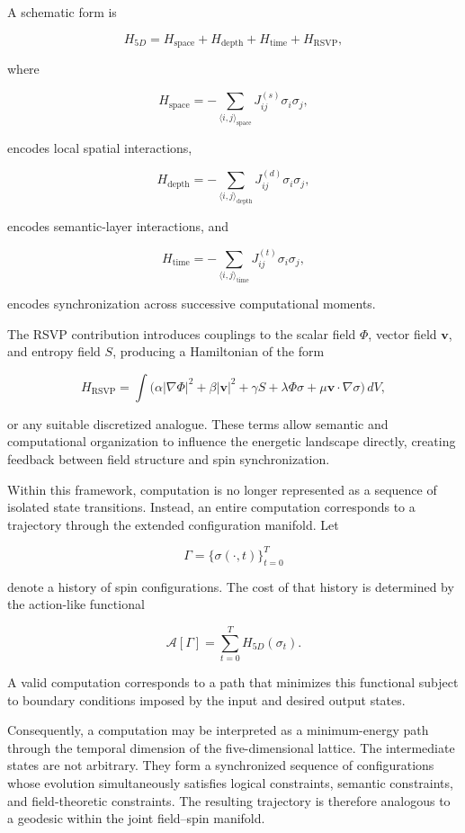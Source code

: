 \documentclass[12pt,letterpaper]{article}
\theoremstyle{remark}
\begin{document}
A schematic form is

\[
H_{5D} =
H_{\mathrm{space}}
+
H_{\mathrm{depth}}
+
H_{\mathrm{time}}
+
H_{\mathrm{RSVP}},
\]

where

\[
H_{\mathrm{space}} = -\sum_{\langle i,j\rangle_{\mathrm{space}}}
J^{(s)}_{ij}
\sigma_i\sigma_j,
\]

encodes local spatial interactions,

\[
H_{\mathrm{depth}} = -\sum_{\langle i,j\rangle_{\mathrm{depth}}}
J^{(d)}_{ij}
\sigma_i\sigma_j,
\]

encodes semantic-layer interactions, and

\[
H_{\mathrm{time}} = -
\sum_{\langle i,j\rangle_{\mathrm{time}}}
J^{(t)}_{ij}
\sigma_i\sigma_j,
\]

encodes synchronization across successive computational moments.

The RSVP contribution introduces couplings to the scalar field $\Phi$, vector field $\mathbf{v}$, and entropy field $S$, producing a Hamiltonian of the form

\[
H_{\mathrm{RSVP}} =
\int
\Big(
\alpha|\nabla\Phi|^2
+
\beta|\mathbf{v}|^2
+
\gamma S
+
\lambda\Phi\sigma
+
\mu\mathbf{v}\cdot\nabla\sigma
\Big)\,dV,
\]

or any suitable discretized analogue. These terms allow semantic and computational organization to influence the energetic landscape directly, creating feedback between field structure and spin synchronization.

Within this framework, computation is no longer represented as a sequence of isolated state transitions. Instead, an entire computation corresponds to a trajectory through the extended configuration manifold. Let

\[
\Gamma =
\bigl\{
\sigma(\cdot,t)
\bigr\}_{t=0}^{T}
\]

denote a history of spin configurations. The cost of that history is determined by the action-like functional

\[
\mathcal{A}[\Gamma] =
\sum_{t=0}^{T}
H_{5D}(\sigma_t).
\]

A valid computation corresponds to a path that minimizes this functional subject to boundary conditions imposed by the input and desired output states.

Consequently, a computation may be interpreted as a minimum-energy path through the temporal dimension of the five-dimensional lattice. The intermediate states are not arbitrary. They form a synchronized sequence of configurations whose evolution simultaneously satisfies logical constraints, semantic constraints, and field-theoretic constraints. The resulting trajectory is therefore analogous to a geodesic within the joint field--spin manifold.
\end{document}

